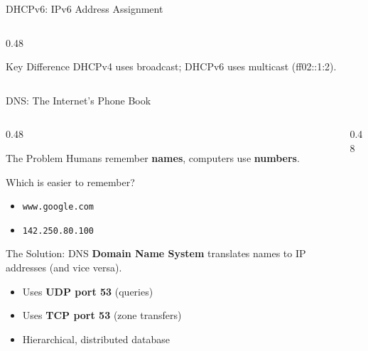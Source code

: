 \documentclass[aspectratio=169, 11pt]{beamer}
\newcommand{\iconpc}[1][0.6cm]{\resizebox{#1}{!}{\faDesktop}}
\newcommand{\keyterm}[1]{\textbf{\textcolor{rctcblue}{#1}}}
\begin{document}
\begin{frame}{DHCPv6: IPv6 Address Assignment}
\begin{columns}[T]
\begin{column}{0.48\textwidth}
            \vspace{0.2em}
            \begin{alertblock}{Key Difference}
                \small
                DHCPv4 uses broadcast; DHCPv6 uses multicast (ff02::1:2).
            \end{alertblock}
        \end{column}
    \end{columns}
\end{frame}

\begin{frame}{DNS: The Internet's Phone Book}
    \begin{columns}[T]
        \begin{column}{0.48\textwidth}
            \begin{block}{The Problem}
                \small
                Humans remember \textbf{names}, computers use \textbf{numbers}.
                
                \vspace{0.2em}
                Which is easier to remember?
                \begin{itemize}
                    \item \texttt{www.google.com}
                    \item \texttt{142.250.80.100}
                \end{itemize}
            \end{block}
            
            \vspace{0.2em}
            \begin{block}{The Solution: DNS}
                \small
                \keyterm{Domain Name System} translates names to IP addresses (and vice versa).
                
                \vspace{0.2em}
                \begin{itemize}\setlength{\itemsep}{1pt}
                    \item Uses \textbf{UDP port 53} (queries)
                    \item Uses \textbf{TCP port 53} (zone transfers)
                    \item Hierarchical, distributed database
                \end{itemize}
            \end{block}
        \end{column}
        \begin{column}{0.48\textwidth}
            \begin{center}
\end{center}
\end{column}
\end{columns}
\end{frame}
\end{document}

